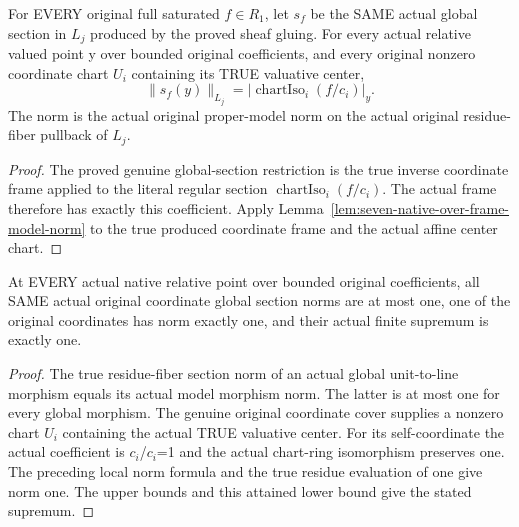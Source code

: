 \begin{theorem}
\label{thm:seven-native-original-degree-one-local-norm}
\leanok
For EVERY original full saturated $f\in R_1$, let $s_f$ be the SAME actual
global section in $L_j$ produced by the proved sheaf gluing. For every actual
relative valued point y over bounded original coefficients, and every
original nonzero coordinate chart $U_i$ containing its TRUE valuative center,
\[
 \|s_f(y)\|_{L_j}=|\operatorname{chartIso}_i(f/c_i)|_y.
\]
The norm is the actual original proper-model norm on the actual original
residue-fiber pullback of $L_j$.
\end{theorem}
\begin{proof}
The proved genuine global-section restriction is the true inverse
coordinate frame applied to the literal regular section
$\operatorname{chartIso}_i(f/c_i)$. The actual frame therefore has exactly
this coefficient. Apply Lemma~\ref{lem:seven-native-over-frame-model-norm}
to the true produced coordinate frame and the actual affine center chart.
\end{proof}

\begin{theorem}
\label{thm:seven-native-coordinate-model-norm-unit-sup}
\leanok
At EVERY actual native relative point over bounded original coefficients,
all SAME actual original coordinate global section norms are at most one,
one of the original coordinates has norm exactly one, and their actual
finite supremum is exactly one.
\end{theorem}
\begin{proof}
The true residue-fiber section norm of an actual global unit-to-line
morphism equals its actual model morphism norm. The latter is at most one
for every global morphism. The genuine original coordinate cover supplies
a nonzero chart $U_i$ containing the actual TRUE valuative center. For its
self-coordinate the actual coefficient is $c_i$/$c_i$=1 and the actual
chart-ring isomorphism preserves one. The preceding local norm formula
and the true residue evaluation of one give norm one. The upper bounds
and this attained lower bound give the stated supremum.
\end{proof}

